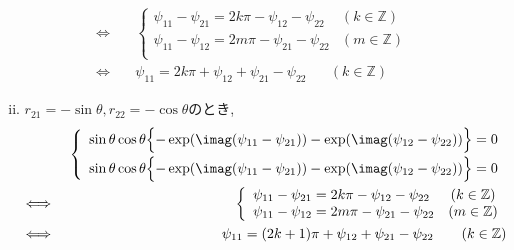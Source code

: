 \documentclass[dvipdfmx,titlepage, 11pt, a4paper]{jsarticle}%
\begin{document}
\begin{enumerate}[(1)]
\begin{enumerate}[(i)]
\begin{eqnarray*}
        \Longleftrightarrow\ &&\left\{
                                \begin{array}{lc}
                                  \psi_{11}-\psi_{21}=2k\pi -\psi_{12}-\psi_{22}&(k\in\mathbb{Z})\\
                                  \psi_{11}-\psi_{12}=2m\pi-\psi_{21}-\psi_{22}&(m\in\mathbb{Z})\\
                                \end{array}
        \right.\\
        \Longleftrightarrow\ && \psi_{11}=2k\pi+\psi_{12}+\psi_{21}-\psi_{22}\hspace{20pt} (k\in\mathbb{Z})
      \end{eqnarray*}
    \item $r_{21}=-\sin\theta,r_{22}=-\cos\theta$のとき,
      \begin{eqnarray*}
        &&\left\{
        \begin{array}{l}
          \sin\theta\cos\theta\Bigl\{-\exp(\imag(\psi_{11}-\psi_{21}))-\exp(\imag(\psi_{12}-\psi_{22}))\Bigr\}=0\\[0.2cm]
          \sin\theta\cos\theta\Bigl\{-\exp(\imag(\psi_{11}-\psi_{21}))-\exp(\imag(\psi_{12}-\psi_{22}))\Bigr\}=0
        \end{array}
        \right.\\
        \Longleftrightarrow\ &&\left\{
                                \begin{array}{lc}
                                  \psi_{11}-\psi_{21}=2k\pi -\psi_{12}-\psi_{22}&(k\in\mathbb{Z})\\
                                  \psi_{11}-\psi_{12}=2m\pi-\psi_{21}-\psi_{22}&(m\in\mathbb{Z})\\
                                \end{array}
        \right.\\
        \Longleftrightarrow\ && \psi_{11}=(2k+1)\pi+\psi_{12}+\psi_{21}-\psi_{22}\hspace{20pt} (k\in\mathbb{Z})
      \end{eqnarray*}


\end{enumerate}
\end{enumerate}
\end{document}
